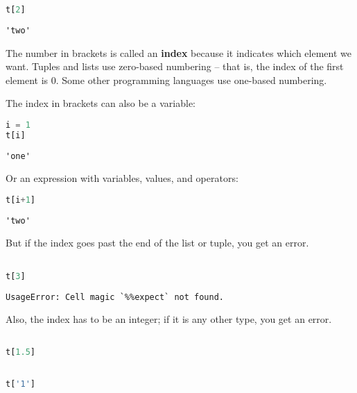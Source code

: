 \begin{lstlisting}[language=Python,style=source]
t[2]
\end{lstlisting}

\begin{lstlisting}[style=output]
'two'
\end{lstlisting}

The number in brackets is called an \textbf{index} because it indicates
which element we want. Tuples and lists use zero-based numbering -- that
is, the index of the first element is 0. Some other programming
languages use one-based numbering.

The index in brackets can also be a variable:

\begin{lstlisting}[language=Python,style=source]
i = 1
t[i]
\end{lstlisting}

\begin{lstlisting}[style=output]
'one'
\end{lstlisting}

Or an expression with variables, values, and operators:

\begin{lstlisting}[language=Python,style=source]
t[i+1]
\end{lstlisting}

\begin{lstlisting}[style=output]
'two'
\end{lstlisting}

But if the index goes past the end of the list or tuple, you get an
error.

\begin{lstlisting}[language=Python,style=source]
%%expect IndexError

t[3]
\end{lstlisting}

\begin{lstlisting}[style=output]
UsageError: Cell magic `%%expect` not found.
\end{lstlisting}

Also, the index has to be an integer; if it is any other type, you get
an error.

\begin{lstlisting}[language=Python,style=source]
%%expect TypeError

t[1.5]
\end{lstlisting}

\begin{lstlisting}[language=Python,style=source]
%%expect TypeError

t['1']
\end{lstlisting}


